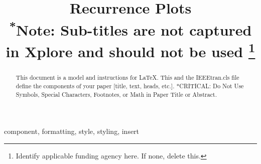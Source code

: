 \documentclass[conference]{IEEEtran}
\begin{document}
\title{Recurrence Plots\\
{\footnotesize \textsuperscript{*}Note: Sub-titles are not captured in Xplore and
should not be used}
\thanks{Identify applicable funding agency here. If none, delete this.}
}

\author{
\and
{}
}

\maketitle

\begin{abstract}
This document is a model and instructions for \LaTeX.
This and the IEEEtran.cls file define the components of your paper [title, text, heads, etc.]. *CRITICAL: Do Not Use Symbols, Special Characters, Footnotes, 
or Math in Paper Title or Abstract.
\end{abstract}

\begin{IEEEkeywords}
component, formatting, style, styling, insert
\end{IEEEkeywords}
\end{document}
